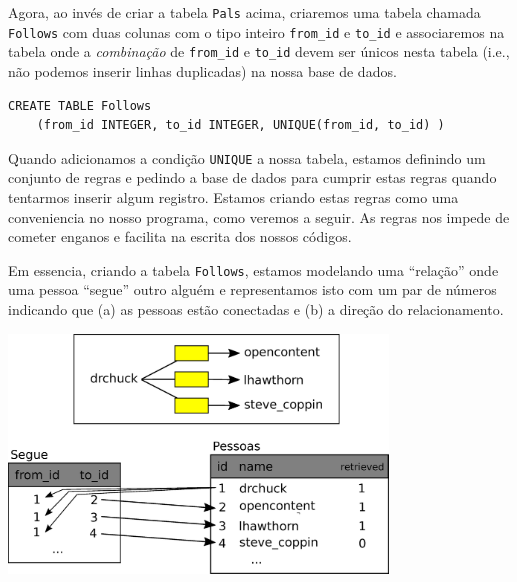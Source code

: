 
Agora, ao invés de criar a tabela {\tt Pals} acima, criaremos uma tabela
chamada {\tt Follows} com duas colunas com o tipo inteiro \verb"from_id" e
\verb"to_id" e associaremos na tabela onde a \emph{combinação} de
\verb"from_id" e \verb"to_id" devem ser únicos nesta tabela (i.e., não podemos
inserir linhas duplicadas) na nossa base de dados.

\beforeverb
\begin{verbatim}
CREATE TABLE Follows 
    (from_id INTEGER, to_id INTEGER, UNIQUE(from_id, to_id) )
\end{verbatim}
\afterverb
%

Quando adicionamos a condição {\tt UNIQUE} a nossa tabela, estamos definindo
um conjunto de regras e pedindo a base de dados para cumprir estas regras
quando tentarmos inserir algum registro. Estamos criando estas regras como uma
conveniencia no nosso programa, como veremos a seguir. As regras nos impede de
cometer enganos e facilita na escrita dos nossos códigos.


Em essencia, criando a tabela {\tt Follows}, estamos modelando uma ``relação''
onde uma pessoa ``segue'' outro alguém e representamos isto com um par de
números indicando que (a) as pessoas estão conectadas e (b) a direção do
relacionamento.

\beforefig
\centerline{\includegraphics[height=2.50in]{figs2/twitter.eps}}
\afterfig


